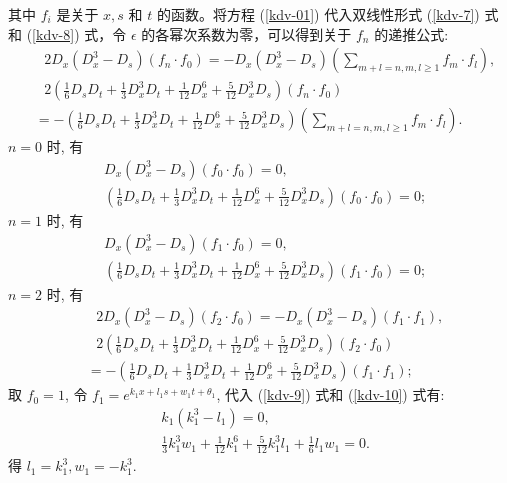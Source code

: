 其中 $f_i$ 是关于 $x,s$ 和 $t$ 的函数。将方程 (\ref{kdv-01}) 代入双线性形式 (\ref{kdv-7}) 式和 (\ref{kdv-8}) 式，令 $\epsilon$ 的各幂次系数为零，可以得到关于 $f_n$ 的递推公式:
\begin{align}
&~~~2D_x(D_x^3-D_s)(f_n\cdot f_0)=-D_x(D_x^3-D_s)(\sum_{m+l=n,m,l\geqslant1}f_m\cdot f_l),\nonumber\\
&~~~2(\frac{1}{6}D_sD_t+\frac{1}{3}D_x^3D_t+\frac{1}{12}D_x^6+\frac{5}{12}D_x^3D_s)(f_n\cdot f_0)\nonumber\\
&=-(\frac{1}{6}D_sD_t+\frac{1}{3}D_x^3D_t+\frac{1}{12}D_x^6+\frac{5}{12}D_x^3D_s)(\sum_{m+l=n,m,l\geqslant1}f_m\cdot f_l).\nonumber
\end{align}
$n=0$ 时, 有
\begin{align}
&D_x(D_x^3-D_s)(f_0\cdot f_0)=0,\nonumber\\
&(\frac{1}{6}D_sD_t+\frac{1}{3}D_x^3D_t+\frac{1}{12}D_x^6+\frac{5}{12}D_x^3D_s)(f_0\cdot f_0)=0;\nonumber
\end{align}
$n=1$ 时, 有
\begin{align}
&D_x(D_x^3-D_s)(f_1\cdot f_0)=0,\label{kdv-9}\\
&(\frac{1}{6}D_sD_t+\frac{1}{3}D_x^3D_t+\frac{1}{12}D_x^6+\frac{5}{12}D_x^3D_s)(f_1\cdot f_0)=0;\label{kdv-10}
\end{align}
$n=2$ 时, 有
\begin{align}
&~~~2D_x(D_x^3-D_s)(f_2\cdot f_0)=-D_x(D_x^3-D_s)(f_1\cdot f_1),\label{kdv-02}\\
&~~~2(\frac{1}{6}D_sD_t+\frac{1}{3}D_x^3D_t+\frac{1}{12}D_x^6+\frac{5}{12}D_x^3D_s)(f_2\cdot f_0)\nonumber\\
&=-(\frac{1}{6}D_sD_t+\frac{1}{3}D_x^3D_t+\frac{1}{12}D_x^6+\frac{5}{12}D_x^3D_s)(f_1\cdot f_1);\nonumber
\end{align}
取 $f_0=1$, 令 $f_1=e^{k_1x+l_1s+w_1t+\theta_1}$, 代入 (\ref{kdv-9}) 式和 (\ref{kdv-10}) 式有:
\begin{align}
&k_1(k_1^3-l_1)=0,\nonumber\\
&\frac{1}{3}k_1^3w_1+\frac{1}{12}k_1^6+\frac{5}{12}k_1^3l_1+\frac{1}{6}l_1w_1=0.\nonumber
\end{align}
得 $l_1=k_1^3, w_1=-k_1^3.$

